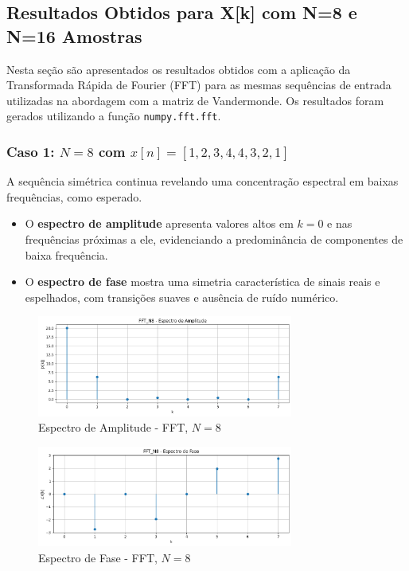 \documentclass[12pt]{article}
\begin{document}
\subsection{Resultados Obtidos para X[k] com N=8 e N=16 Amostras}

Nesta seção são apresentados os resultados obtidos com a aplicação da Transformada Rápida de Fourier (FFT) para as mesmas sequências de entrada utilizadas na abordagem com a matriz de Vandermonde. Os resultados foram gerados utilizando a função \texttt{numpy.fft.fft}.

\subsubsection{Caso 1: $N = 8$ com $x[n] = [1, 2, 3, 4, 4, 3, 2, 1]$}

A sequência simétrica continua revelando uma concentração espectral em baixas frequências, como esperado.

\begin{itemize}
    \item O \textbf{espectro de amplitude} apresenta valores altos em $k=0$ e nas frequências próximas a ele, evidenciando a predominância de componentes de baixa frequência.
    \item O \textbf{espectro de fase} mostra uma simetria característica de sinais reais e espelhados, com transições suaves e ausência de ruído numérico.
\end{itemize}

\begin{figure}[H]
    \centering
    \includegraphics[width=0.75\textwidth]{imagens/FFT_N8_amplitude.png}
    \caption{Espectro de Amplitude - FFT, $N=8$}
\end{figure}

\begin{figure}[H]
    \centering
    \includegraphics[width=0.75\textwidth]{imagens/FFT_N8_fase.png}
    \caption{Espectro de Fase - FFT, $N=8$}
\end{figure}
\end{document}
